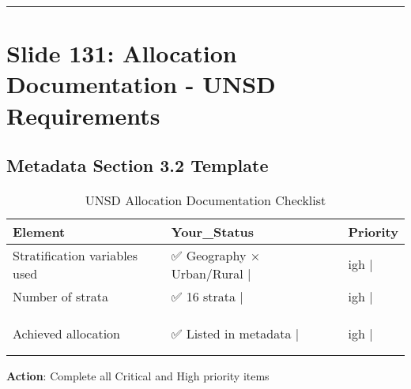 \documentclass[
]{article}
\begin{document}
\begin{center}\rule{0.5\linewidth}{0.5pt}\end{center}

\section{Slide 131: Allocation Documentation - UNSD
Requirements}\label{slide-131-allocation-documentation---unsd-requirements}

\subsection{Metadata Section 3.2
Template}\label{metadata-section-3.2-template}

\begin{longtable}[t]{lll}
\caption{\label{tab:allocation-doc}UNSD Allocation Documentation Checklist}\\
\toprule
Element & Your\_Status & Priority\\
\midrule
Stratification variables used & ✅ Geography × Urban/Rural            | & igh     |\\
Number of strata & ✅ 16 strata                          | & igh     |\\
\cellcolor[HTML]{fff3cd}{Allocation method} & \cellcolor[HTML]{fff3cd}{⚠️ Near-proportional (document method)} & \cellcolor[HTML]{fff3cd}{|Critical}\\
\cellcolor[HTML]{ffcccc}{Minimum constraints applied} & \cellcolor[HTML]{ffcccc}{❌ Not documented                     |} & \cellcolor[HTML]{ffcccc}{igh     |}\\
\cellcolor[HTML]{ffcccc}{Cost data used} & \cellcolor[HTML]{ffcccc}{❌ Not used in allocation             |} & \cellcolor[HTML]{ffcccc}{edium   |}\\
\addlinespace
Achieved allocation & ✅ Listed in metadata                 | & igh     |\\
\cellcolor[HTML]{ffcccc}{Efficiency measures} & \cellcolor[HTML]{ffcccc}{❌ Not calculated                     |} & \cellcolor[HTML]{ffcccc}{igh     |}\\
\cellcolor[HTML]{ffcccc}{Software/code used} & \cellcolor[HTML]{ffcccc}{❌ Not documented                     |} & \cellcolor[HTML]{ffcccc}{edium   |}\\
\bottomrule
\end{longtable}

\textbf{Action}: Complete all Critical and High priority items
\end{document}
